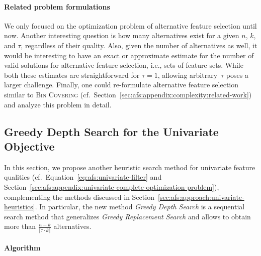 \documentclass{article}
\theoremstyle{definition}
\begin{document}
\paragraph{Related problem formulations}

We only focused on the optimization problem of alternative feature selection until now.
Another interesting question is how many alternatives exist for a given $n$, $k$, and $\tau$, regardless of their quality.
Also, given the number of alternatives as well, it would be interesting to have an exact or approximate estimate for the number of valid solutions for alternative feature selection, i.e., sets of feature sets.
While both these estimates are straightforward for $\tau = 1$, allowing arbitrary~$\tau$ poses a larger challenge.
Finally, one could re-formulate alternative feature selection similar to \textsc{Bin Covering} (cf.~Section~\ref{sec:afs:appendix:complexity:related-work}) and analyze this problem in detail.

\subsection{Greedy Depth Search for the Univariate Objective}
\label{sec:afs:appendix:greedy-depth}

In this section, we propose another heuristic search method for univariate feature qualities (cf.~Equation~\ref{eq:afs:univariate-filter} and Section~\ref{sec:afs:appendix:univariate-complete-optimization-problem}), complementing the methods discussed in Section~\ref{sec:afs:approach:univariate-heuristics}.
In particular, the new method \emph{Greedy Depth Search} is a sequential search method that generalizes \emph{Greedy Replacement Search} and allows to obtain more than $\frac{n - k}{\lceil \tau \cdot k \rceil}$ alternatives.

\paragraph{Algorithm}
\end{document}

